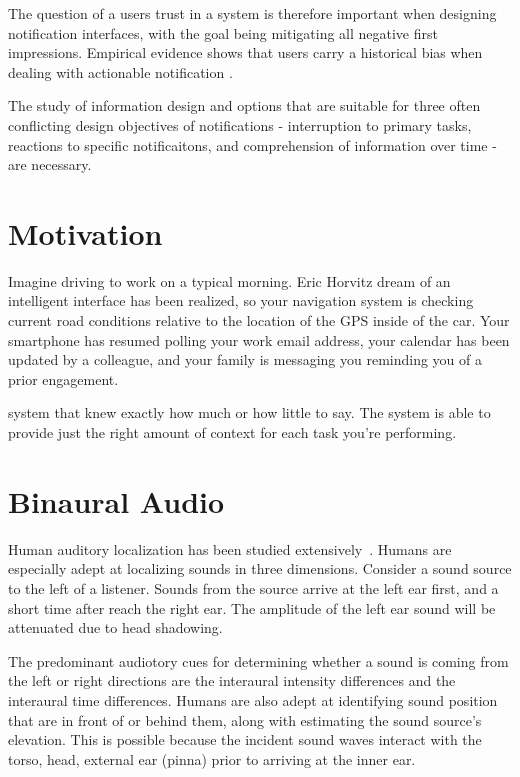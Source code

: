 \documentclass[12pt]{report}
\begin{document}
The question of a users trust in a system is therefore important when designing notification
interfaces, with the goal being mitigating all negative first impressions.  Empirical evidence shows that
users carry a historical bias when dealing with actionable notification \cite{leetiernan2001effective}.

The study of information design and options that are suitable for three often conflicting design objectives
of notifications - interruption to primary tasks, reactions to specific notificaitons, and comprehension
of information over time - are necessary.

\section{ Motivation }
Imagine driving to work on a typical morning. Eric Horvitz dream of an intelligent interface has been
realized, so your navigation system is checking current road conditions relative to
the location of the GPS inside of the car. Your smartphone has resumed polling your work
email address, your calendar has been updated by a colleague, and your family is
messaging you reminding you of a prior engagement.


 system that knew exactly how much or how little to say.  The system is able to
provide just the right amount of context for each task you're performing.

\section{ Binaural Audio}

Human auditory localization has been studied extensively~\cite{yost1987directional, blauert1997spatial}.
Humans are especially adept at localizing sounds in three dimensions.
Consider a sound source to the left of a listener.  Sounds from the
source arrive at the left ear first, and a short time after reach
the right ear.  The amplitude of the left ear sound will be attenuated
due to head shadowing.

The predominant audiotory cues for determining whether a sound is
coming from the left or right directions are the  interaural intensity
differences and the interaural time differences. Humans are also adept at
identifying sound position that are in front of or behind them, along
with estimating the sound source's elevation.  This is possible because
the incident sound waves interact with the torso, head, external ear
(pinna) prior to arriving at the inner ear.
\end{document}
